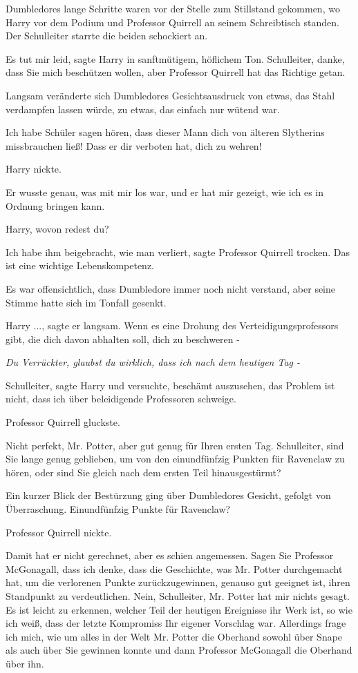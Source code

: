 Dumbledores lange Schritte waren vor der Stelle zum Stillstand gekommen, wo
Harry vor dem Podium und Professor Quirrell an seinem Schreibtisch standen. Der
Schulleiter starrte die beiden schockiert an.

\glqq{}Es tut mir leid\grqq{}, sagte Harry in sanftmütigem, höflichem Ton. \glqq{}
Schulleiter, danke, dass Sie mich beschützen wollen, aber Professor Quirrell hat
das Richtige getan.\grqq{}

Langsam veränderte sich Dumbledores Gesichtsausdruck von etwas, das Stahl
verdampfen lassen würde, zu etwas, das einfach nur wütend war.

\glqq{}Ich habe Schüler sagen hören, dass dieser Mann dich von älteren Slytherins
missbrauchen ließ! Dass er dir verboten hat, dich zu wehren!\grqq{}

Harry nickte.

\glqq{}Er wusste genau, was mit mir los war, und er hat mir gezeigt, wie ich es
in Ordnung bringen kann.\grqq{}

\glqq{}Harry, wovon redest du?\grqq{}

\glqq{}Ich habe ihm beigebracht, wie man verliert\grqq{}, sagte Professor
Quirrell trocken. \glqq{}Das ist eine wichtige Lebenskompetenz.\grqq{}

Es war offensichtlich, dass Dumbledore immer noch nicht verstand, aber seine
Stimme hatte sich im Tonfall gesenkt.

\glqq{}Harry ...\grqq{}, sagte er langsam. \glqq{}Wenn es eine Drohung des
Verteidigungsprofessors gibt, die dich davon abhalten soll, dich zu beschweren
-\grqq{}

\emph{Du Verrückter, glaubst du wirklich, dass ich nach dem heutigen Tag -}

\glqq{}Schulleiter\grqq{}, sagte Harry und versuchte, beschämt auszusehen, \glqq{}
das Problem ist nicht, dass ich über beleidigende Professoren schweige.\grqq{}

Professor Quirrell gluckste.

\glqq{}Nicht perfekt, Mr. Potter, aber gut genug für Ihren ersten Tag.
Schulleiter, sind Sie lange genug geblieben, um von den einundfünfzig Punkten
für Ravenclaw zu hören, oder sind Sie gleich nach dem ersten Teil
hinausgestürmt?\grqq{}

Ein kurzer Blick der Bestürzung ging über Dumbledores Gesicht, gefolgt von
Überraschung. \glqq{}Einundfünfzig Punkte für Ravenclaw?\grqq{}

Professor Quirrell nickte.

\glqq{}Damit hat er nicht gerechnet, aber es schien angemessen. Sagen Sie
Professor McGonagall, dass ich denke, dass die Geschichte, was Mr. Potter
durchgemacht hat, um die verlorenen Punkte zurückzugewinnen, genauso gut
geeignet ist, ihren Standpunkt zu verdeutlichen. Nein, Schulleiter, Mr. Potter
hat mir nichts gesagt. Es ist leicht zu erkennen, welcher Teil der heutigen
Ereignisse ihr Werk ist, so wie ich weiß, dass der letzte Kompromiss Ihr eigener
Vorschlag war. Allerdings frage ich mich, wie um alles in der Welt Mr. Potter
die Oberhand sowohl über Snape als auch über Sie gewinnen konnte und dann
Professor McGonagall die Oberhand über ihn.\grqq{}

